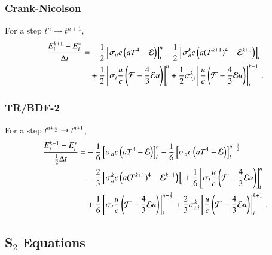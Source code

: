 \subsubsection{Crank-Nicolson}
For a step $t^n\rightarrow t^{n+1}$,
\begin{equation}\begin{split}
  \frac{E_i^{k+1}-E_i^*}{\dt} = &
  -\half\left[\sigma_{a} c\left(aT^4 - \E\right)\right]_i^n
  -\half\left[\sigma_{a}^k c\left(a(T^{k+1})^4 - \E^{k+1}\right)\right]_i\\
  &+\half\left[\sigma_{t}\frac{u}{c}\left(\F-\frac{4}{3}\E u\right)\right]_i^n
   +\half\sigma_{t,i}^k\left[\frac{u}{c}\left(\F-\frac{4}{3}\E u\right)\right]_i^{k+1}
  \pep
\lequ{hydroECNfull}
\end{split}\end{equation}

\subsubsection{TR/BDF-2}
For a step $t^{n+\frac{1}{2}}\rightarrow t^{n+1}$,
\begin{equation}\begin{split}
  \frac{E_i^{k+1}-E_i^*}{\half\dt} = &
  -\sixth\left[\sigma_a c\left(aT^4 - \E\right)\right]_i^n
  -\sixth\left[\sigma_a c\left(aT^4 - \E\right)\right]_i^{n+\half}\\
  &-\frac{2}{3}\left[\sigma_a^k c\left(a(T^{k+1})^4 - \E^{k+1}\right)\right]_i
   +\sixth\left[\sigma_t\frac{u}{c}\left(\F-\frac{4}{3}\E u\right)\right]_i^n\\
  &+\sixth\left[\sigma_t\frac{u}{c}\left(\F-\frac{4}{3}\E u\right)\right]_i^{n+\half}
   +\frac{2}{3}\sigma_{t,i}^k\left[\frac{u}{c}\left(\F
   -\frac{4}{3}\E u\right)\right]_i^{k+1}
  \pep
\lequ{hydroEBDF2full}
\end{split}\end{equation}

\subsection{\texorpdfstring{S$_2$}{S-2} Equations}
